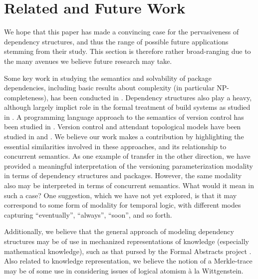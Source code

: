 \documentclass[hoptionsi,review,screen,format=sigconf]{acmart}
\theoremstyle{definition}
\begin{document}



\section{Related and Future Work}

We hope that this paper has made a convincing case for the pervasiveness of dependency structures, and thus the range of possible future applications stemming from their study. This section is therefore rather broad-ranging due to the many avenues we believe future research may take.

Some key work in studying the semantics and solvability of package dependencies, including basic results about complexity (in particular NP-completeness),  has been conducted in \cite{di2006edos, abate2012dependency}. Dependency structures also play a heavy, although largely implict role in the formal treatment of build systems as studied in \cite{mitchell:shake_24_sep_2018}. A programming language approach to the semantics of version control has been studied in \cite{swierstra2014semantics}. Version control and attendant topological models have been studied in \cite{angiuli2014homotopical} and \cite{mimram2013categorical}. We believe our work makes a contribution by highlighting the essential similarities involved in these approaches, and its relationship to concurrent semantics. As one example of transfer in the other direction, we have provided a meaningful interpretation of the versioning parameterization modality in terms of dependency structures and packages. However, the same modality also may be interpreted in terms of concurrent semantics. What would it mean in such a case? One suggestion, which we have not yet explored, is that it may correspond to some form of modality for temporal logic, with different modes capturing ``eventually'', ``always'', ``soon'', and so forth.

Additionally, we believe that the general approach of modeling dependency structures may be of use in mechanized representations of knowledge (especially mathematical knowledge), such as that pursed by the Formal Abstracts project \cite{fabstract}. Also related to knowledge representation, we believe the notion of a Merkle-trace may be of some use in considering issues of logical atomism à la Wittgenstein.
\end{document}
